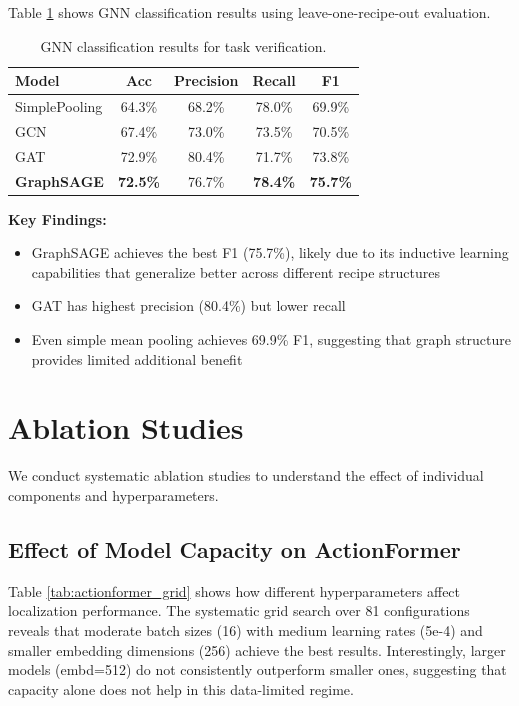 \documentclass[10pt,twocolumn,letterpaper]{article}
\begin{document}
Table \ref{tab:gnn} shows GNN classification results using leave-one-recipe-out evaluation.

\begin{table}[h]
\centering
\caption{GNN classification results for task verification.}
\label{tab:gnn}
\begin{tabular}{lcccc}
\toprule
Model & Acc & Precision & Recall & F1 \\
\midrule
SimplePooling & 64.3\% & 68.2\% & 78.0\% & 69.9\% \\
GCN & 67.4\% & 73.0\% & 73.5\% & 70.5\% \\
GAT & 72.9\% & 80.4\% & 71.7\% & 73.8\% \\
\textbf{GraphSAGE} & \textbf{72.5\%} & 76.7\% & \textbf{78.4\%} & \textbf{75.7\%} \\
\bottomrule
\end{tabular}
\end{table}

\textbf{Key Findings:}
\begin{itemize}
    \item GraphSAGE achieves the best F1 (75.7\%), likely due to its inductive learning capabilities that generalize better across different recipe structures
    \item GAT has highest precision (80.4\%) but lower recall
    \item Even simple mean pooling achieves 69.9\% F1, suggesting that graph structure provides limited additional benefit
\end{itemize}

\section{Ablation Studies}

We conduct systematic ablation studies to understand the effect of individual components and hyperparameters.

\subsection{Effect of Model Capacity on ActionFormer}

Table \ref{tab:actionformer_grid} shows how different hyperparameters affect localization performance. The systematic grid search over 81 configurations reveals that moderate batch sizes (16) with medium learning rates (5e-4) and smaller embedding dimensions (256) achieve the best results. Interestingly, larger models (embd=512) do not consistently outperform smaller ones, suggesting that capacity alone does not help in this data-limited regime.
\end{document}
